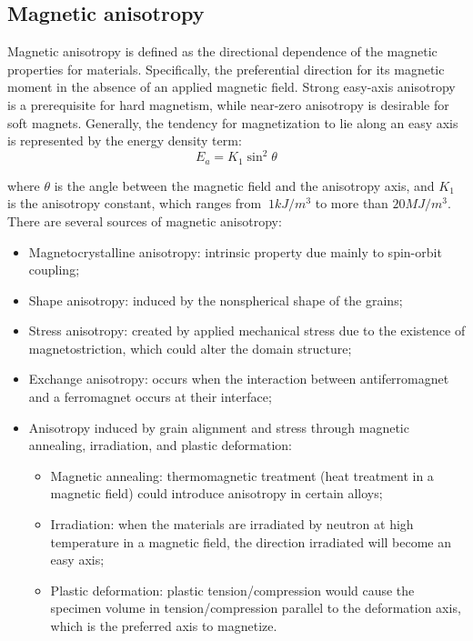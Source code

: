 \subsection{Magnetic anisotropy}
Magnetic anisotropy is defined as the directional dependence of the magnetic
properties for materials. Specifically, the preferential direction for its magnetic moment in the absence of an applied magnetic field. Strong easy-axis anisotropy is a prerequisite for hard magnetism, while near-zero anisotropy is desirable for soft magnets.
Generally, the tendency for magnetization to lie along an easy axis is represented by the energy
density term:
\begin{equation}
E_a = K_1 \sin^2 \theta
\end{equation}

where $\theta$ is the angle between the magnetic field and the anisotropy axis, and $K_1$ is the
anisotropy constant, which ranges from $~1 kJ/m^3$ to more than $20 MJ/m^3$.  There are
several sources of magnetic anisotropy:
\begin{itemize}
\item Magnetocrystalline anisotropy: intrinsic property due mainly to spin-orbit coupling;
\item Shape anisotropy: induced by the nonspherical shape of the grains; 
\item Stress anisotropy: created by applied mechanical stress due to the existence of magnetostriction, which could alter the domain structure;
\item Exchange anisotropy: occurs when the interaction between antiferromagnet and a ferromagnet occurs at their interface;
\item Anisotropy induced by grain alignment and stress through magnetic
annealing, irradiation, and plastic deformation:
\begin{itemize}
\item Magnetic annealing: thermomagnetic treatment (heat treatment in a magnetic field) could introduce anisotropy in certain alloys;
\item Irradiation: when the materials are irradiated by neutron at high temperature in a magnetic field, the direction irradiated will become an
easy axis;
\item Plastic deformation: plastic tension/compression would cause the specimen volume in tension/compression parallel to the deformation axis, which is the preferred axis to magnetize.
\end{itemize}

\end{itemize}

